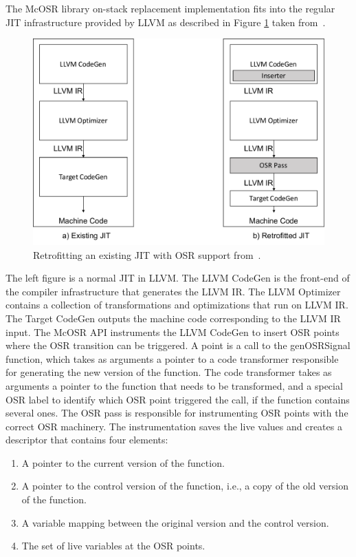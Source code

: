 The McOSR library on-stack replacement implementation fits into the regular JIT infrastructure provided by LLVM as described in Figure \ref{McOSRArchitecture} taken from~\cite{lameed2013modular}. 
\begin{figure}[h]
\centering
\includegraphics[scale=0.5]{Figures/MCJitArchitecture}
\decoRule
\caption[Retrofitting an existing JIT with OSR support]{Retrofitting an existing JIT with OSR support from~\cite{lameed2013modular}.}
\label{McOSRArchitecture}
\end{figure}
The left figure is a normal JIT in LLVM. 
The LLVM CodeGen is the front-end of the compiler infrastructure that generates the LLVM IR.
The LLVM Optimizer contains a collection of transformations and optimizations that run on LLVM IR. 
The Target CodeGen outputs the machine code corresponding to the LLVM IR input. 
The McOSR API instruments the LLVM CodeGen to insert OSR points where the OSR transition can be triggered. 
A point is a call to the genOSRSignal function, which takes as arguments a pointer to a code transformer responsible for generating the new version of the function.
The code transformer takes as arguments a pointer to the function that needs to be transformed, and a special OSR label to identify which OSR point triggered the call, if the function contains several ones.
The OSR pass is responsible for instrumenting OSR points with the correct OSR machinery.
The instrumentation saves the live values and creates a descriptor that contains four elements: 
\begin{enumerate}
    \item A pointer to the current version of the function. 
    \item A pointer to the control version of the function, i.e., a copy of the old version of the function.
    \item A variable mapping between the original version and the control version.
    \item The set of live variables at the OSR points. 
\end{enumerate}\\

